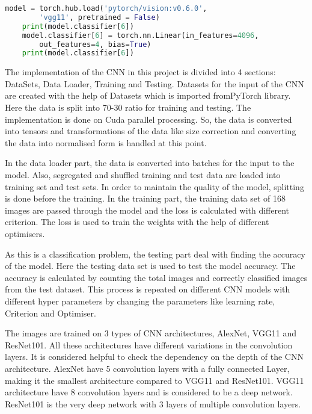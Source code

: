 \begin{lstlisting}[language=Python, frame=single, caption=Using PyTorch pre-defined modules]
    model = torch.hub.load('pytorch/vision:v0.6.0', 
    	'vgg11', pretrained = False)
    print(model.classifier[6])
    model.classifier[6] = torch.nn.Linear(in_features=4096, 
    	out_features=4, bias=True)
    print(model.classifier[6])
\end{lstlisting}

The implementation of the CNN in this project is divided into 4 sections: DataSets, Data Loader, Training and Testing. Datasets for the input of the CNN are created with the help of Datasets which is imported fromPyTorch library. Here the data is split into 70-30 ratio for training and testing. The implementation is done on Cuda parallel processing. So, the data is converted into tensors and transformations of the data like size correction and converting the data into normalised form is handled at this point.

In the data loader part, the data is converted into batches for the input to the model. Also, segregated and shuffled training and test data are loaded into training set and test sets. In order to maintain the quality of the model, splitting is done before the training. In the training part, the training data set of 168 images are passed through the model and the loss is calculated with different criterion. The loss is used to train the weights with the help of different optimisers.

As this is a classification problem, the testing part deal with finding the accuracy of the model. Here the testing data set is used to test the model accuracy. The accuracy is calculated by counting the total images and correctly classified images from the test dataset. This process is repeated on different CNN models with different hyper parameters by changing the parameters like learning rate, Criterion and Optimiser.

The images are trained on 3 types of CNN architectures, AlexNet, VGG11 and ResNet101. All these architectures have different variations in the convolution layers. It is considered helpful to check the dependency on the depth of the CNN architecture. AlexNet have 5 convolution layers with a fully connected Layer, making it the smallest architecture compared to VGG11 and ResNet101. VGG11 architecture have 8 convolution layers and is considered to be a deep network. ResNet101 is the very deep network with 3 layers of multiple convolution layers.

